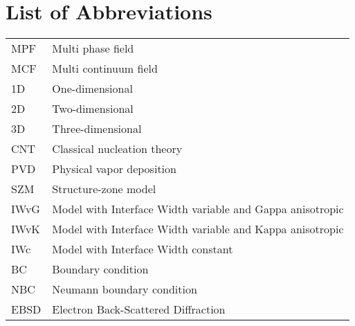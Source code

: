 \section*{List of Abbreviations}

\begin{longtable}{ll}
	MPF & Multi phase field \\
	MCF & Multi continuum field \\
	1D & One-dimensional \\
	2D & Two-dimensional \\
	3D & Three-dimensional \\
	CNT & Classical nucleation theory \\
	PVD & Physical vapor deposition \\
	SZM & Structure-zone model \\
	IWvG & Model with Interface Width variable and Gappa anisotropic \\
	IWvK & Model with Interface Width variable and Kappa anisotropic \\
	IWc & Model with Interface Width constant \\
	BC & Boundary condition \\
	NBC & Neumann boundary condition \\
	EBSD & Electron Back-Scattered Diffraction \\
\end{longtable}


%
%
%
%




\cleardoublepage

